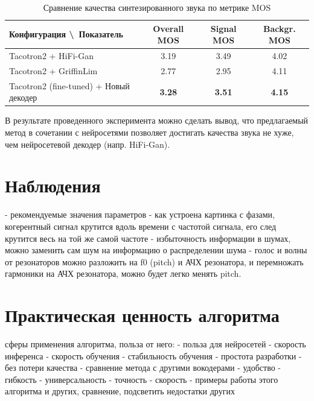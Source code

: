 \begin{table}[h!]
\centering

\begin{tabular}{||m{5cm} c c c||} 
 \hline
  Конфигурация \textbackslash \ Показатель &  Overall MOS & Signal MOS & Backgr. MOS \\ [0.5ex] 
 \hline\hline
  Tacotron2 + HiFi-Gan & 3.19 & 3.49 & 4.02 \\
  Tacotron2 + GriffinLim & 2.77 & 2.95 & 4.11 \\
  Tacotron2 (fine-tuned) + Новый декодер & \textbf{3.28} & \textbf{3.51} & \textbf{4.15} \\ [1ex] 
 \hline
\end{tabular}
\caption{Сравнение качества синтезированного звука по метрике MOS}
\label{table:mos_tacotron}
\end{table}

В результате проведенного эксперимента можно сделать вывод, что предлагаемый метод в сочетании с нейросетями 
позволяет достигать качества звука не хуже, чем нейросетевой декодер (напр. HiFi-Gan).

\section{Наблюдения}
\begin{markdown}
  - рекомендуемые значения параметров
  - как устроена картинка с фазами, когерентный сигнал крутится вдоль времени с частотой сигнала, его след крутится весь на той же самой частоте
  - избыточность информации в шумах, можно заменить сам шум на информацию о распределении шума
  - голос и волны от резонаторов можно разложить на f0 (pitch) и АЧХ резонатора, и перемножать гармоники на АЧХ резонатора, можно будет легко менять pitch.
\end{markdown}

\section{Практическая ценность алгоритма}
\begin{markdown}
   сферы применения алгоритма, польза от него:
    - польза для нейросетей
      - скорость инференса
      - скорость обучения
      - стабильность обучения
      - простота разработки
      - без потери качества
  - сравнение метода с другими вокодерами
    - удобство
    - гибкость
    - универсальность
    - точность
    - скорость
  - примеры работы этого алгоритма и других, сравнение, подсветить недостатки других
\end{markdown}

